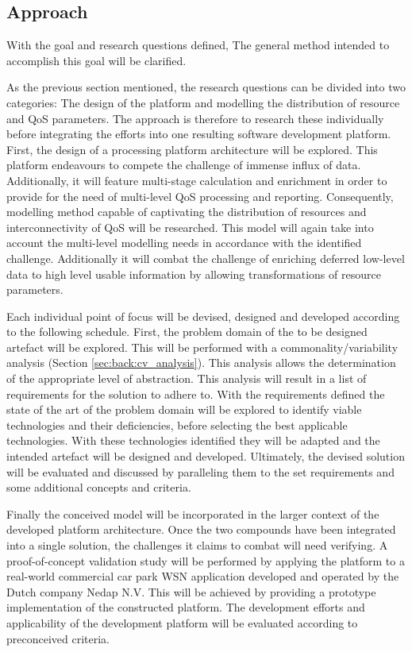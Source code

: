\subsection{Approach}
With the goal and research questions defined, The general method intended to accomplish this goal will be clarified.

As the previous section mentioned, the research questions can be divided into two categories: The design of the platform and modelling the distribution of resource and QoS parameters. The approach is therefore to research these individually before integrating the efforts into one resulting software development platform. First, the design of a processing platform architecture will be explored. This platform endeavours to compete the challenge of immense influx of data. Additionally, it will feature multi-stage calculation and enrichment in order to provide for the need of multi-level QoS processing and reporting. Consequently, modelling method capable of captivating the distribution of resources and interconnectivity of QoS will be researched. This model will again take into account the multi-level modelling needs in accordance with the identified challenge. Additionally it will combat the challenge of enriching deferred low-level data to high level usable information by allowing transformations of resource parameters. 

Each individual point of focus will be devised, designed and developed according to the following schedule. First, the problem domain of the to be designed artefact will be explored. This will be performed with a commonality/variability analysis (Section \ref{sec:back:cv_analysis}). This analysis allows the determination of the appropriate level of abstraction. This analysis will result in a list of requirements for the solution to adhere to. With the requirements defined the state of the art of the problem domain will be explored to identify viable technologies and their deficiencies, before selecting the best applicable technologies. With these technologies identified they will be adapted and the intended artefact will be designed and developed. Ultimately, the devised solution will be evaluated and discussed by paralleling them to the set requirements and some additional concepts and criteria. 

Finally the conceived model will be incorporated in the larger context of the developed platform architecture. Once the two compounds have been integrated into a single solution, the challenges it claims to combat will need verifying. A proof-of-concept validation study will be performed by applying the platform to a real-world commercial car park WSN application developed and operated by the Dutch company Nedap N.V. This will be achieved by providing a prototype implementation of the constructed platform. The development efforts and applicability of the development platform will be evaluated according to preconceived criteria.


